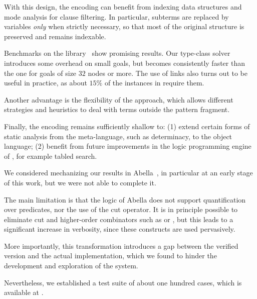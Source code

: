 With this design, the encoding can benefit from indexing data
structures and mode analysis for clause filtering. In
particular, subterms are replaced by variables \textit{only} when
strictly necessary, so that most of the original structure is
preserved and remains indexable.

Benchmarks on the \stdpp library~\cite{iris-junk} show
promising results. Our type-class solver introduces some
overhead on small goals, but becomes consistently faster than
the \rocq one for goals of size $32$ nodes or more. The use of
links also turns out to be useful in practice, as about $15\%$
of the instances in \stdpp require them.

Another advantage is the flexibility of the approach, which
allows different strategies and heuristics to deal with terms
outside the pattern fragment.

Finally, the encoding remains sufficiently shallow to:
(1) extend certain forms of static analysis from the
meta-language, such as determinacy, to the object language;
(2) benefit from future improvements in the logic programming
engine of \elpi, for example tabled search.

We considered mechanizing our results in
Abella~\cite{abella}, in particular at an early stage of this
work, but we were not able to complete it.

The main limitation is that the logic of Abella does not support
quantification over predicates, nor the use of the cut operator.
It is in principle possible to eliminate cut and higher-order
combinators such as  or , but this leads to a
significant increase in verbosity, since these constructs are
used pervasively.

More importantly, this transformation introduces a gap between
the verified version and the actual implementation, which we
found to hinder the development and exploration of the system.

Nevertheless, we established a test suite of about one hundred
cases, which is available at \githubUrl.%










